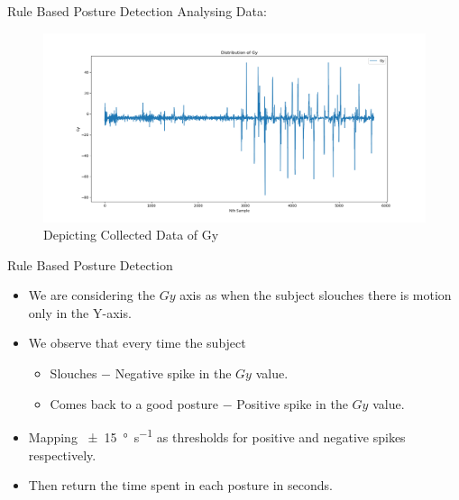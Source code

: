 \documentclass[aspectratio=169,xcolor=dvipsnames]{beamer}
\begin{document}
\begin{frame}{Rule Based Posture Detection}
    Analysing Data:
   \begin{figure}
       \centering
       \includegraphics[scale=0.3]{gy_dist.png}
       \caption{Depicting Collected Data of Gy}
       \label{fig:piximage}
   \end{figure}
  \end{frame}

\begin{frame}{Rule Based Posture Detection}
    \begin{itemize}
        \item We are considering the $Gy$ axis as when the subject slouches
            there is motion only in the Y-axis.
        \item We observe that every time the subject
            \begin{itemize}
                \item Slouches $-$ Negative spike in the $Gy$ value.
                \item Comes back to a good posture $-$ Positive spike in the
                    $Gy$ value.
            \end{itemize}
        \item Mapping \qty{\pm15}{\degree\per\second} as thresholds for positive and negative
            spikes respectively.
        \item Then return the time spent in each posture in seconds.
    \end{itemize}
\end{frame}




\end{document}
